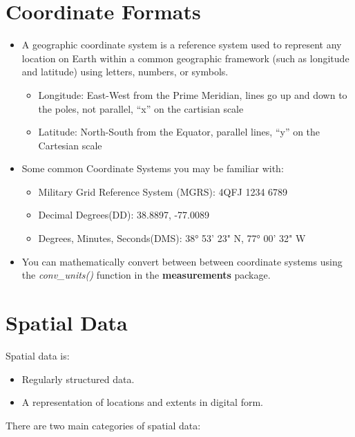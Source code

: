 \documentclass[oneside]{memoir}
\theoremstyle{definition}
\theoremstyle{definition}
\theoremstyle{definition}
\theoremstyle{remark}
\begin{document}
\section{Coordinate Formats}\label{coordinate-formats}

\begin{itemize}
\item
  A geographic coordinate system is a reference system used to represent
  any location on Earth within a common geographic framework (such as
  longitude and latitude) using letters, numbers, or symbols.

  \begin{itemize}
  \item
    Longitude: East-West from the Prime Meridian, lines go up and down
    to the poles, not parallel, ``x'' on the cartisian scale
  \item
    Latitude: North-South from the Equator, parallel lines, ``y'' on the
    Cartesian scale
  \end{itemize}
\item
  Some common Coordinate Systems you may be familiar with:

  \begin{itemize}
  \item
    Military Grid Reference System (MGRS): 4QFJ 1234 6789
  \item
    Decimal Degrees(DD): 38.8897, -77.0089
  \item
    Degrees, Minutes, Seconds(DMS): 38° 53' 23" N, 77° 00' 32" W
  \end{itemize}
\item
  You can mathematically convert between between coordinate systems
  using the \emph{conv\_units()} function in the \textbf{measurements}
  package.
\end{itemize}

\section{Spatial Data}\label{spatial-data}

Spatial data is:

\begin{itemize}
\item
  Regularly structured data.
\item
  A representation of locations and extents in digital form.
\end{itemize}

There are two main categories of spatial data:
\end{document}
